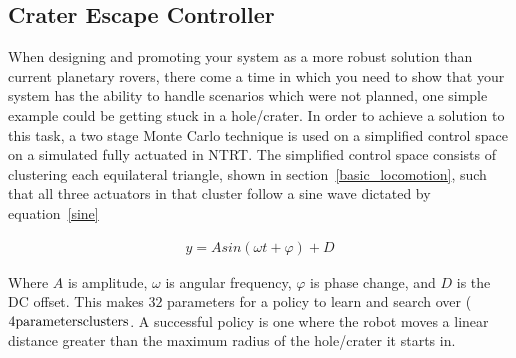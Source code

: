 
\subsection{Crater Escape Controller}
\label{sec:crater}
When designing and promoting your system as a more robust solution than current planetary rovers, there come a time in which you need to show that your system has the ability to handle scenarios which were not planned, one simple example could be getting stuck in a hole/crater.
In order to achieve a solution to this task, a two stage Monte Carlo technique is used on a simplified control space on a simulated fully actuated \SB{} in NTRT.
The simplified control space consists of clustering each equilateral triangle, shown in section~\ref{basic_locomotion}, such that all three actuators in that cluster follow a sine wave dictated by equation~\ref{sine}

\begin{align}
y = Asin(\omega t + \varphi) + D
\label{sine}
\end{align}

Where \(A\) is amplitude, \(\omega\) is angular frequency, \(\varphi\) is phase change, and \(D\) is the DC offset.
This makes \(32\) parameters for a policy to learn and search over (\(4 \text{parameters} \time 8 \text{clusters}\).
A successful policy is one where the robot moves a linear distance greater than the maximum radius of the hole/crater it starts in.

